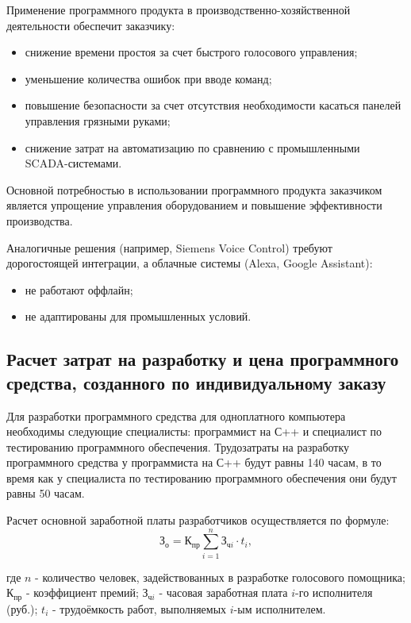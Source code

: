 Применение программного продукта в производственно-хозяйственной деятельности обеспечит заказчику:
\begin{itemize}
	\item снижение времени простоя за счет быстрого голосового управления;
	\item уменьшение количества ошибок при вводе команд;
	\item повышение безопасности за счет отсутствия необходимости касаться панелей управления грязными руками;
	\item снижение затрат на автоматизацию по сравнению с промышленными SCADA-системами.
\end{itemize}


Основной потребностью в использовании программного продукта заказчиком является упрощение управления оборудованием и повышение эффективности производства. 

Аналогичные решения (например, Siemens Voice Control) требуют дорогостоящей интеграции, а облачные системы (Alexa, Google Assistant):
\begin{itemize}
	\item не работают оффлайн;
	\item не адаптированы для промышленных условий.
\end{itemize}




\subsection{Расчет затрат на разработку и цена программного средства, созданного по индивидуальному заказу} 


Для разработки программного средства для одноплатного компьютера необходимы следующие специалисты: программист на С++ и специалист по тестированию программного обеспечения. Трудозатраты на разработку программного средства у программиста на С++ будут равны 140 часам, в то время как у специалиста по тестированию программного обеспечения они будут равны 50 часам.

Расчет основной заработной платы разработчиков осуществляется по формуле:
\begin{equation}
	\mathrm{З_{о}} =  \mathrm{К_{пр}} \sum_{i=1}^n \text{З}_{\text{ч}i} \cdot t_i,
	\label{eq:formula}
\end{equation}

где $n$ - количество человек, задействованных в разработке голосового помощника; 
$\text{К}_{\text{пр}}$ - коэффициент премий; 
$\text{З}_{\text{ч}i}$ - часовая заработная плата $i$-го исполнителя (руб.); 
$t_i$ - трудоёмкость работ, выполняемых $i$-ым исполнителем.

